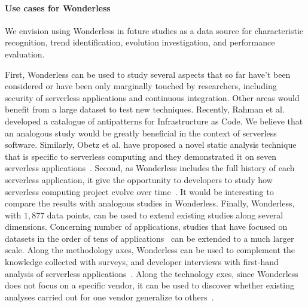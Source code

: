 \paragraph{Use cases for Wonderless}
We envision using Wonderless in future studies as a data source for characteristic recognition, 
trend identification, evolution investigation, and performance evaluation.

First, Wonderless can be used to study several aspects that so far have't
been considered or have been only marginally touched by researchers, 
including security of serverless applications and continuous integration.
%
Other areas would benefit from a large dataset to test new techniques.
Recently, Rahman et al.~\cite{DBLP:journals/ese/RahmanFW20} developed a 
catalogue of antipatterns for Infrastructure as Code. We believe that an analogous 
study would be greatly beneficial in the context of serverless software.
Similarly, Obetz et al. have proposed a novel static analysis technique that is  
specific to serverless computing and they demonstrated it on 
seven serverless applications~\cite{10.5555/3357034.3357059}.
%
Second, as Wonderless includes the full history of each serverless application, 
it give the opportunity to developers to study how serverless computing 
project evolve over time~\cite{sousa2020characterizing, du2020understanding, wen2020empirical}. 
It would be interesting to compare the results with analogous studies in Wonderless.
%
Finally, Wonderless, with $1,877$ data points, can be used to extend existing 
studies along several dimensions. Concerning number of applications,
studies that have focused on datasets in the order of tens of 
applications~\cite{eismann2020serverless} can be extended to a much larger scale.
Along the methodology axes, Wonderless can be used to complement the knowledge collected 
with surveys, and developer interviews with first-hand analysis of
serverless applications~\cite{leitner2019mixed}.
Along the technology exes, since Wonderless does not focus on a specific vendor, it can be used
to discover whether existing analyses carried out for one vendor
generalize to others~\cite{spillner2019quantitative}.











